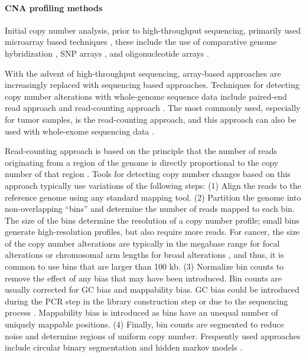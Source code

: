 \paragraph{CNA profiling methods}
Initial copy number analysis, prior to high-throughput sequencing,
primarily used microarray based techniques \citep{carter2007methods},
these include the use of comparative genome hybridization
\citep{pinkel1998high}, SNP arrays \citep{nannya2005robust}, and
oligonucleotide arrays \citep{lucito2003representational}.

With the advent of high-throughput sequencing, array-based approaches
are increasingly replaced with sequencing based approaches.  Techniques
for detecting copy number alterations with whole-genome sequence data
include paired-end read approach \citep{korbel2007paired,
campbell2008identification} and read-counting approach
\citep{yoon2009sensitive}.  The most commonly used, especially for tumor
samples, is the read-counting approach, and this approach can also be
used with whole-exome sequencing data \citep{krumm2012copy,d2016enhanced}.

Read-counting approach is based on the principle that the number of
reads originating from a region of the genome is directly proportional
to the copy number of that region \citep{baslan2015optimizing}.
%
Tools for detecting copy number changes based on this approach typically
use variations of the following steps:
%
(1) Align the reads to the reference genome using any standard mapping
tool.
%
(2) Partition the genome into non-overlapping ``bins'' and determine
the number of reads mapped to each bin. The size of the bins determine
the resolution of a copy number profile; small bins generate
high-resolution profiles, but also require more reads. For cancer, the
size of the copy number alterations are typically in the megabase
range for focal alterations or chromosomal arm lengths for broad
alterations \citep{beroukhim2010landscape}, and thus, it is common to
use bins that are larger than 100 kb.
%
(3) Normalize bin counts to remove the effect of any bias that may have
been introduced. Bin counts are usually corrected for GC bias and
mappability bias. GC bias could be introduced during the PCR step in the
library construction step or due to the sequencing process
\citep{aird2011analyzing,benjamini2012summarizing}. Mappability bias is
introduced as bins have an unequal number of uniquely mappable positions.
%
(4) Finally, bin counts are segmented to reduce noise and determine
regions of uniform copy number. Frequently used approaches include
circular binary segmentation
\citep{olshen2004circular,venkatraman2007faster} and hidden markov
models \citep{ha2014titan}.

